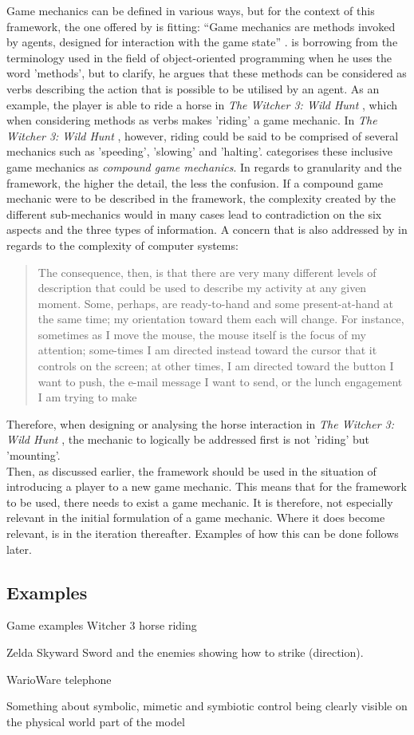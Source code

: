 Game mechanics can be defined in various ways, but for the context of this framework, the one offered by  is fitting: ``Game mechanics are methods invoked by agents, designed for interaction with the game state'' \cite{sicartmechanic}.  is borrowing from the terminology used in the field of object-oriented programming when he uses the word 'methods', but to clarify, he argues that these methods can be considered as verbs describing the action that is possible to be utilised by an agent. As an example, the player is able to ride a horse in \textit{The Witcher 3: Wild Hunt} \cite{witcher}, which when considering methods as verbs makes 'riding' a game mechanic. In \textit{The Witcher 3: Wild Hunt} \cite{witcher}, however, riding could be said to be comprised of several mechanics such as 'speeding', 'slowing' and 'halting'.  categorises these inclusive game mechanics as \textit{compound game mechanics}. In regards to granularity and the framework, the higher the detail, the less the confusion. If a compound game mechanic were to be described in the framework, the complexity created by the different sub-mechanics would in many cases lead to contradiction on the six aspects and the three types of information. A concern that is also addressed by  in regards to the complexity of computer systems:
\begin{quote}
  The consequence, then, is that there are very many different levels of description that could be used to describe my activity at any given moment. Some, perhaps, are ready-to-hand and some present-at-hand at the same time; my orientation toward them each will change. For instance, sometimes as I move the mouse, the mouse itself is the focus of my attention; some-times I am directed instead toward the cursor that it controls on the screen; at other times, I am directed toward the button I want to push, the e-mail message I want to send, or the lunch engagement I am trying to make \cite[p. 140]{dourish}
\end{quote}
Therefore, when designing or analysing the horse interaction in \textit{The Witcher 3: Wild Hunt} \cite{witcher}, the mechanic to logically be addressed first is not 'riding' but 'mounting'. \\
Then, as discussed earlier, the framework should be used in the situation of introducing a player to a new game mechanic. This means that for the framework to be used, there needs to exist a game mechanic. It is therefore, not especially relevant in the initial formulation of a game mechanic. Where it does become relevant, is in the iteration thereafter. Examples of how this can be done follows later.

\subsection{Examples}
Game examples Witcher 3 horse riding

Zelda Skyward Sword and the enemies showing how to strike (direction).

WarioWare telephone

Something about symbolic, mimetic and symbiotic control being clearly visible on the physical world part of the model \cite[p. 64]{calleja}
